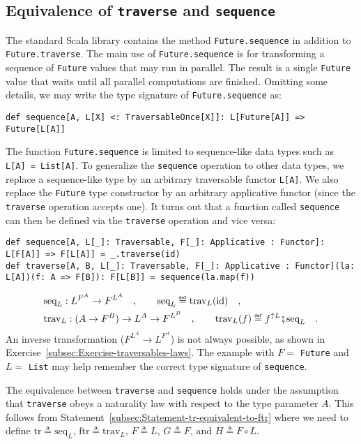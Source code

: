 \subsection{Equivalence of \texttt{traverse} and \texttt{sequence}}

The standard Scala library contains the method \lstinline!Future.sequence!
in addition to \lstinline!Future.traverse!. The main use of \lstinline!Future.sequence!
is for transforming a sequence of \lstinline!Future! values that
may run in parallel. The result is a single \lstinline!Future! value
that waits until all parallel computations are finished. Omitting
some details, we may write the type signature of \lstinline!Future.sequence!
as:
\begin{lstlisting}
def sequence[A, L[X] <: TraversableOnce[X]]: L[Future[A]] => Future[L[A]]
\end{lstlisting}

The function \lstinline!Future.sequence! is limited to sequence-like
data types such as \lstinline!L[A] = List[A]!. To generalize the
\lstinline!sequence! operation to other data types, we replace a
sequence-like type by an arbitrary traversable functor \lstinline!L[A]!.
We also replace the \lstinline!Future! type constructor by an arbitrary
applicative functor (since the \lstinline!traverse! operation accepts
one). It turns out that a function called \lstinline!sequence! can
then be defined via the \lstinline!traverse! operation and vice versa:
\begin{lstlisting}
def sequence[A, L[_]: Traversable, F[_]: Applicative : Functor]: L[F[A]] => F[L[A]] = _.traverse(id)
def traverse[A, B, L[_]: Traversable, F[_]: Applicative : Functor](la: L[A])(f: A => F[B]): F[L[B]] = sequence(la.map(f))
\end{lstlisting}
\begin{align*}
 & \text{seq}_{L}:L^{F^{A}}\rightarrow F^{L^{A}}\quad,\quad\quad\text{seq}_{L}\triangleq\text{trav}_{L}(\text{id})\quad,\\
 & \text{trav}_{L}:(A\rightarrow F^{B})\rightarrow L^{A}\rightarrow F^{L^{B}}\quad,\quad\quad\text{trav}_{L}(f)\triangleq f^{\uparrow L}\bef\text{seq}_{L}\quad.
\end{align*}
An inverse transformation ($F^{L^{A}}\rightarrow L^{F^{A}}$) is not
always possible, as shown in Exercise~\ref{subsec:Exercise-traversables-laws}.
The example with $F=$ \lstinline!Future! and $L=$ \lstinline!List!
may help remember the correct type signature of \lstinline!sequence!.

The equivalence between \lstinline!traverse! and \lstinline!sequence!
holds under the assumption that \lstinline!traverse! obeys a naturality
law with respect to the type parameter $A$. This follows from Statement~\ref{subsec:Statement-tr-equivalent-to-ftr}
where we need to define $\text{tr}\triangleq\text{seq}_{L}$, $\text{ftr}\triangleq\text{trav}_{L}$,
$F\triangleq L$, $G\triangleq F$, and $H\triangleq F\circ L$. 

